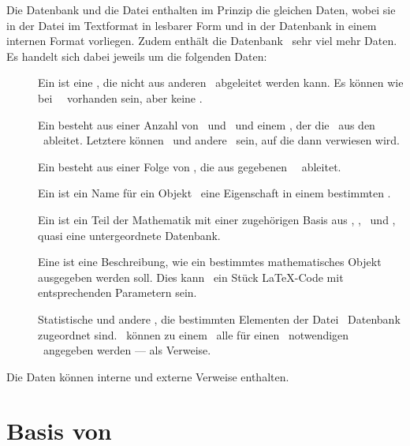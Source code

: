 Die Datenbank und die Datei enthalten im Prinzip die gleichen Daten, wobei sie in der Datei im Textformat in lesbarer Form und in der Datenbank in einem internen Format vorliegen.
Zudem enthält die Datenbank \textiAlg\ sehr viel mehr Daten. Es handelt sich dabei jeweils um die folgenden Daten:
\begin{description}
	\item[\Axiome]          \label{Daten-Axiom}
	Ein  ist eine \Aussage, die nicht aus anderen \Aussagen\ abgeleitet werden kann.
	Es können wie bei \Saetzen\ \Voraussetzungen\ vorhanden sein, aber keine \Beweise.
	\item[\Saetze]          \label{Daten-Satz}
	Ein  besteht aus einer Anzahl von \Voraussetzungen\ und \Folgerungen\ und einem \Beweis, der die \Folgerungen\ aus den \Voraussetzungen\ ableitet.
	Letztere können \Axiome\ und andere \Saetze\ sein, auf die dann verwiesen wird.
	\item[\Beweise]         \label{Daten-Beweis}
	Ein  besteht aus einer Folge von \Beweisschritten, die aus gegebenen \Voraussetzungen\ \Folgerungen\ ableitet.
	\item[\Fachbegriffe]    \label{Daten-Fachbegriff}
	Ein  ist ein Name für ein Objekt \textbzw\ eine Eigenschaft in einem bestimmten \Fachgebiet.
	\item[\Fachgebiete]     \label{Daten-Fachgebiet}
	Ein  ist ein Teil der Mathematik mit einer zugehörigen Basis aus \Axiomen, \Saetzen, \Fachbegriffen\ und \Ausgabeschemata, quasi eine untergeordnete Datenbank.
	\item[\Ausgabeschemata] \label{Daten-Ausgabeschema}
	Eine  ist eine Beschreibung, wie ein bestimmtes mathematisches Objekt ausgegeben werden soll.
	Dies kann \textzB\ ein Stück \LaTeX-Code mit entsprechenden Parametern sein.
	\item[\Auswertungen]     \label{Daten-Auswertung}
	Statistische und andere \Auswertungen, die bestimmten Elementen der Datei \textbzw\ Datenbank zugeordnet sind.
	\textZB\ können zu einem \Satz\ alle für einen \Beweis\ notwendigen \Axiome\ angegeben werden --- als Verweise.
\end{description}
Die Daten können interne und externe Verweise enthalten.

\section[Basis von Beweisen]{Basis von \Beweisen}%
\label                             {sec-BeweisBasis}

